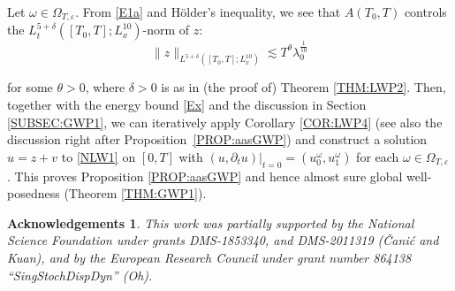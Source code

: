 \documentclass[letterpaper, 11pt,  reqno]{amsart}
\newcommand{\1}{\hspace{0.5mm}\text{I}\hspace{0.2mm}}
\newcommand{\noi}{\noindent}
\newcommand{\dl}{\delta}
\newcommand{\eps}{\varepsilon}
\newcommand{\ld}{\lambda}
\newcommand{\dt}{\partial_t}
\newcommand{\ta}{\theta}
\renewcommand{\o}{\omega}
\renewcommand{\O}{\Omega}
\newcommand{\les}{\lesssim}
\newtheorem*{ackno}{Acknowledgements}
\numberwithin{equation}{section}
\numberwithin{theorem}{section}
\begin{document}
Let  $\o \in \O_{T, \eps}$.
From 
\eqref{E1a}
and H\"older's inequality, we see that $A(T_0, T)$ controls
the $L^{5+\dl}_t([T_0, T]; L^{10}_x )$-norm of $z$:
\[  \|z \|_{L^{5+\dl}([T_0, T]; L^{10}_x )}
\les T^\ta \ld_0^\frac{1}{10}\]

\noi
for some $\ta > 0$, 
where $\dl > 0$ is as in (the proof of) Theorem \ref{THM:LWP2}.
Then, together with  the energy bound \eqref{Ex} and the discussion in Section \ref{SUBSEC:GWP1}, 
we can iteratively apply 
Corollary \ref{COR:LWP4}
(see also the discussion right after Proposition~\ref{PROP:aasGWP})
and construct 
a  solution $u = z + v$
to \eqref{NLW1}  on $[0, T]$
with $(u, \dt u)|_{t = 0} = (u_0^\o, u_1^\o)$
for each   $\o \in \O_{T, \eps}$.
This proves Proposition  \ref{PROP:aasGWP}
and hence almost sure global well-posedness
(Theorem \ref{THM:GWP1}).

 

\begin{ackno}\rm

This work was partially supported by the National Science Foundation under grants DMS-1853340, and DMS-2011319 (\v{C}ani\'{c} and Kuan), and 
by the European Research Council under grant number 864138 ``SingStochDispDyn'' (Oh). 


\end{ackno}
\end{document}
